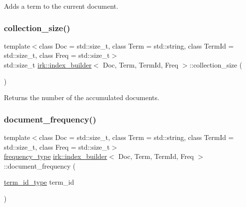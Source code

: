 Adds a term to the current document. 

\mbox{\label{classirk_1_1index__builder_a1acc084abede3f0d143448f9c0f96b7b}} 
\subsubsection{\texorpdfstring{collection\+\_\+size()}{collection\_size()}}
{\footnotesize\ttfamily template$<$class Doc  = std\+::size\+\_\+t, class Term  = std\+::string, class Term\+Id  = std\+::size\+\_\+t, class Freq  = std\+::size\+\_\+t$>$ \\
std\+::size\+\_\+t \mbox{\hyperlink{classirk_1_1index__builder}{irk\+::index\+\_\+builder}}$<$ Doc, Term, Term\+Id, Freq $>$\+::collection\+\_\+size (\begin{DoxyParamCaption}{ }\end{DoxyParamCaption})\hspace{0.3cm}{\ttfamily [inline]}}



Returns the number of the accumulated documents. 

\mbox{\label{classirk_1_1index__builder_ab760ed3512980d0d76395b21b354f45a}} 
\subsubsection{\texorpdfstring{document\+\_\+frequency()}{document\_frequency()}}
{\footnotesize\ttfamily template$<$class Doc  = std\+::size\+\_\+t, class Term  = std\+::string, class Term\+Id  = std\+::size\+\_\+t, class Freq  = std\+::size\+\_\+t$>$ \\
\mbox{\hyperlink{classirk_1_1index__builder_af2efa68fc3f10fd9cb000d16279bfbb1}{frequency\+\_\+type}} \mbox{\hyperlink{classirk_1_1index__builder}{irk\+::index\+\_\+builder}}$<$ Doc, Term, Term\+Id, Freq $>$\+::document\+\_\+frequency (\begin{DoxyParamCaption}\item[{\mbox{\hyperlink{classirk_1_1index__builder_a6736f4a9aa142d3ca15c5e8c3b0a352f}{term\+\_\+id\+\_\+type}}}]{term\+\_\+id }\end{DoxyParamCaption})\hspace{0.3cm}{\ttfamily [inline]}}



